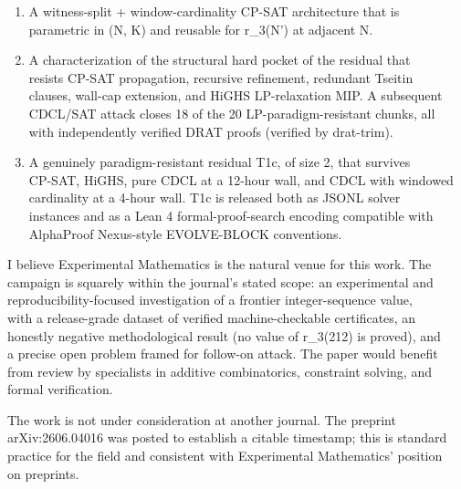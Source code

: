 \documentclass[
]{article}
\begin{document}
\begin{enumerate}
\def\labelenumi{\arabic{enumi}.}
\item
  A witness-split + window-cardinality CP-SAT architecture that is\\
  parametric in (N, K) and reusable for r\_3(N') at adjacent N.
\item
  A characterization of the structural hard pocket of the residual
  that\\
  resists CP-SAT propagation, recursive refinement, redundant Tseitin\\
  clauses, wall-cap extension, and HiGHS LP-relaxation MIP. A
  subsequent\\
  CDCL/SAT attack closes 18 of the 20 LP-paradigm-resistant chunks,
  all\\
  with independently verified DRAT proofs (verified by drat-trim).
\item
  A genuinely paradigm-resistant residual T1c, of size 2, that
  survives\\
  CP-SAT, HiGHS, pure CDCL at a 12-hour wall, and CDCL with windowed\\
  cardinality at a 4-hour wall. T1c is released both as JSONL solver\\
  instances and as a Lean 4 formal-proof-search encoding compatible
  with\\
  AlphaProof Nexus-style EVOLVE-BLOCK conventions.
\end{enumerate}

I believe Experimental Mathematics is the natural venue for this work.
The\\
campaign is squarely within the journal's stated scope: an experimental
and\\
reproducibility-focused investigation of a frontier integer-sequence
value,\\
with a release-grade dataset of verified machine-checkable certificates,
an\\
honestly negative methodological result (no value of r\_3(212) is
proved), and\\
a precise open problem framed for follow-on attack. The paper would
benefit\\
from review by specialists in additive combinatorics, constraint
solving, and\\
formal verification.

The work is not under consideration at another journal. The preprint\\
arXiv:2606.04016 was posted to establish a citable timestamp; this is
standard\\
practice for the field and consistent with Experimental Mathematics'
position\\
on preprints.
\end{document}
